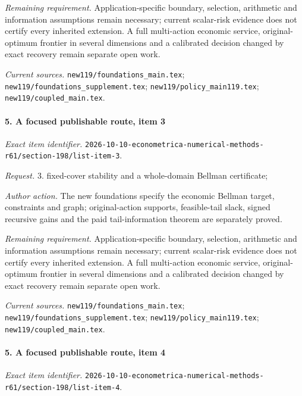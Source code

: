 \par\emph{Remaining requirement.} Application-specific boundary, selection, arithmetic and information assumptions remain necessary; current scalar-risk evidence does not certify every inherited extension. A full multi-action economic service, original-optimum frontier in several dimensions and a calibrated decision changed by exact recovery remain separate open work.

\par\emph{Current sources.} \nolinkurl{new119/foundations_main.tex}; \nolinkurl{new119/foundations_supplement.tex}; \nolinkurl{new119/policy_main119.tex}; \nolinkurl{new119/coupled_main.tex}.

\paragraph{5. A focused publishable route, item 3}

\emph{Exact item identifier.} \nolinkurl{2026-10-10-econometrica-numerical-methods-r61/section-198/list-item-3}.

\par\emph{Request.} 3. fixed-cover stability and a whole-domain Bellman certificate;

\par\emph{Author action.} The new foundations specify the economic Bellman target, constraints and graph; original-action supports, feasible-tail slack, signed recursive gains and the paid tail-information theorem are separately proved.

\par\emph{Remaining requirement.} Application-specific boundary, selection, arithmetic and information assumptions remain necessary; current scalar-risk evidence does not certify every inherited extension. A full multi-action economic service, original-optimum frontier in several dimensions and a calibrated decision changed by exact recovery remain separate open work.

\par\emph{Current sources.} \nolinkurl{new119/foundations_main.tex}; \nolinkurl{new119/foundations_supplement.tex}; \nolinkurl{new119/policy_main119.tex}; \nolinkurl{new119/coupled_main.tex}.

\paragraph{5. A focused publishable route, item 4}

\emph{Exact item identifier.} \nolinkurl{2026-10-10-econometrica-numerical-methods-r61/section-198/list-item-4}.

